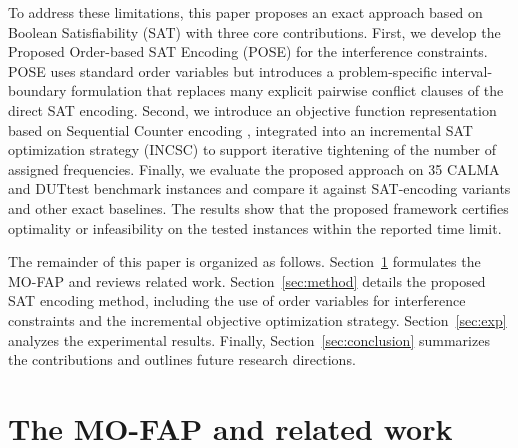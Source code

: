 \documentclass[letterpaper,journal]{IEEEtran}
\begin{document}
To address these limitations, this paper proposes an exact approach based on Boolean Satisfiability (SAT) with three core contributions. 
First, we develop the Proposed Order-based SAT Encoding (POSE) for the interference constraints. POSE uses standard order variables but introduces a problem-specific interval-boundary formulation that replaces many explicit pairwise conflict clauses of the direct SAT encoding.
Second, we introduce an objective function representation based on Sequential Counter encoding \cite{Sinz2005}, integrated into an incremental SAT optimization strategy (INCSC) to support iterative tightening of the number of assigned frequencies. Finally, we evaluate the proposed approach on 35 CALMA and DUTtest benchmark instances and compare it against SAT-encoding variants and other exact baselines. The results show that the proposed framework certifies optimality or infeasibility on the tested instances within the reported time limit.

The remainder of this paper is organized as follows. Section~\ref{sec:Problem_statement} formulates the MO-FAP and reviews related work. Section~\ref{sec:method} details the proposed SAT encoding method, including the use of order variables for interference constraints and the incremental objective optimization strategy. Section~\ref{sec:exp} analyzes the experimental results. Finally, Section~\ref{sec:conclusion} summarizes the contributions and outlines future research directions.

\section{The MO-FAP and related work}
\label{sec:Problem_statement}
\end{document}
